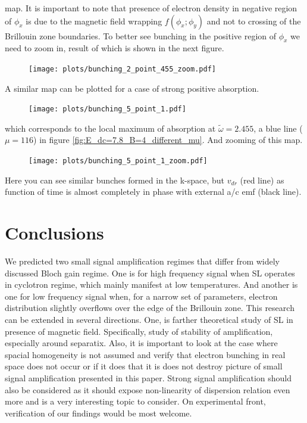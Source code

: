 \documentclass[40pt,letterpaper,physrev]{article}
\begin{document}
	map. It	is important to note that presence of electron density in negative region of $\phi_x$ is due to the magnetic
	field wrapping $f(\phi_x; \phi_y)$ and not to crossing of the Brillouin zone boundaries. To better see bunching in
	the positive region of $\phi_x$ we need to zoom in, result of which is shown in the next figure.
	\begin{figure}[H]
	  \centering
	  \normalsize %
	  \texttt{[image: plots/bunching\_2\_point\_455\_zoom.pdf]}
	  \caption{}	  
	\end{figure}
    A similar map can be plotted for a case of strong positive absorption.
	\begin{figure}[H]
	  \centering
	  \normalsize %
	  \texttt{[image: plots/bunching\_5\_point\_1.pdf]}
	  \caption{}	  
	\end{figure}
	which corresponds to the local maximum of absorption at $\tilde{\omega} = 2.455$, a blue line ($\mu = 116$) 
	in figure \ref{fig:E_dc=7.8_B=4_different_mu}. And zooming of this map.
	\begin{figure}[H]
	  \centering
	  \normalsize %
	  \texttt{[image: plots/bunching\_5\_point\_1\_zoom.pdf]}
	  \caption{}	  
	\end{figure}    
	Here you can see similar bunches formed in the k-space, but $v_{dr}$ (red line) as function of time is almost
    completely in phase with external a/c emf (black line).
    \section{Conclusions}
    We predicted two small signal amplification regimes that differ from widely discussed Bloch gain regime. One is for
    high frequency signal when SL operates in cyclotron regime, which mainly manifest at low temperatures. And another
    is one for low frequency signal when, for a narrow set of parameters, electron distribution slightly overflows over
    the edge of the Brillouin zone. This research can be extended in several directions. One, is farther theoretical
    study of SL in presence of magnetic field. Specifically, study of stability of amplification, especially around
    separatix. Also, it is important to look at the case where spacial homogeneity is not assumed and verify that
    electron bunching in real space does not occur or if it does that it is does not destroy picture of small signal
    amplification presented in this paper. Strong signal amplification should also be considered as it should expose
    non-linearity of dispersion relation even more and is a very interesting topic to consider. On experimental front,
    verification of our findings would be most welcome.    
  	
   	\newpage
\end{document}
